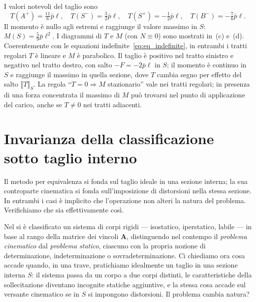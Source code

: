 \begin{esempio}
\begin{svolgimento}
		I valori notevoli del taglio sono
		\begin{equation*}
			T(A^+) = \tfrac{11}{6}\bar p\ell, \quad
			T(S^-) = \tfrac{3}{2}\bar p\ell, \quad
			T(S^+) = -\tfrac{1}{2}\bar p\ell, \quad
			T(B^-) = -\tfrac{7}{6}\bar p\ell.
		\end{equation*}
		Il momento è nullo agli estremi e raggiunge il valore
		massimo in $S$:
		$M(S) = \tfrac{5}{9}\bar p\ell^2$.
		I diagrammi di $T$ e $M$ (con $N \equiv 0$) sono mostrati
		in \,(c) e
		\,(d).
		Coerentemente con le equazioni
		indefinite~\eqref{eq:eq_indefinite}, in entrambi i tratti
		regolari $T$ è lineare e $M$ è parabolico. Il taglio è
		positivo nel tratto sinistro e negativo nel tratto destro,
		con salto $-F = -2\bar p\ell$ in $S$; il momento è continuo
		in $S$ e raggiunge il massimo in quella sezione, dove $T$
		cambia segno per effetto del salto $\llbracket T\rrbracket_S$.
		La regola ``$T = 0 \Rightarrow M$ stazionario'' vale nei
		tratti regolari; in presenza di una forza concentrata
		il massimo di $M$ può trovarsi nel punto di applicazione
		del carico, anche se $T \neq 0$ nei tratti adiacenti.
		
	\end{svolgimento}
\end{esempio}




\section{Invarianza della classificazione sotto taglio interno}
\label{sec:invarianza_classificazione}

Il metodo per equivalenza si fonda sul taglio ideale
in una sezione interna; la sua controparte cinematica
si fonda sull'imposizione di distorsioni nella stessa
sezione. In entrambi i casi è implicito che l'operazione
non alteri la natura del problema. Verifichiamo che sia
effettivamente così.

Nel  si è classificato
un sistema di corpi rigidi --- isostatico, iperstatico,
labile --- in base al rango della matrice dei vincoli
$\bm{A}$, distinguendo nel contempo il \emph{problema
	cinematico} dal \emph{problema statico}, ciascuno con
la propria nozione di determinazione, indeterminazione
o sovradeterminazione. Ci chiediamo ora cosa accade
quando, in una trave, pratichiamo idealmente un taglio
in una sezione interna $S$: il sistema passa da un
corpo a due corpi distinti, le caratteristiche della
sollecitazione diventano incognite statiche aggiuntive,
e la stessa cosa accade sul versante cinematico se in
$S$ si impongono distorsioni. Il problema cambia natura?

